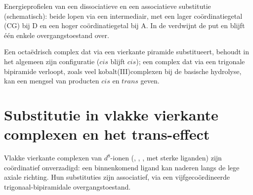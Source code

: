 \begin{omfigure}

{\small Energieprofielen van een dissociatieve en een associatieve
substitutie (schematisch): beide lopen via een intermediair, met een lager
coördinatiegetal (CG) bij D en een hoger coördinatiegetal bij A. In de
 verdwijnt de put en blijft één enkele
overgangstoestand over.}
\end{omfigure}

Een octaëdrisch complex dat via een vierkante piramide substitueert,
behoudt in het algemeen zijn configuratie ($cis$ blijft $cis$); een complex dat via een trigonale
bipiramide verloopt, zoals veel kobalt(III)complexen bij de basische
hydrolyse, kan een
mengsel van producten $cis$ en $trans$ geven.

\section{Substitutie in vlakke vierkante complexen en het trans-effect}

Vlakke vierkante complexen van $d^8$-ionen (, , ,  met sterke liganden)
zijn coördinatief onverzadigd: een binnenkomend ligand kan naderen langs
de lege axiale richting. Hun substituties zijn associatief, via een
vijfgecoördineerde trigonaal-bipiramidale overgangstoestand.

